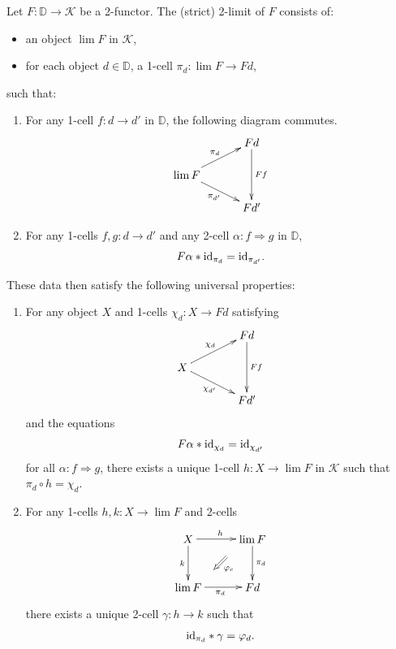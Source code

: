 \begin{Defi}[(2-limits)]\label{Defi:2limit}
Let $F \colon \mathbb{D} \rightarrow \mathcal{K}$ be a 2-functor. The (strict) 2-limit of $F$ consists of:
    \begin{itemize}
        \item an object $\lim F$ in $\mathcal{K}$,
        \item for each object $d \in \mathbb{D}$, a 1-cell $\pi_d \colon \lim F \rightarrow Fd$,
    \end{itemize}
such that:
    \begin{enumerate}
        \item For any 1-cell $f \colon d \rightarrow d'$ in $\mathbb{D}$, the following diagram commutes.
          \[
            \xy
              (0,0)*+{\lim F}="00";
              (20,10)*+{Fd}="10";
              (20,-10)*+{Fd'}="11";
              {\ar^{\pi_d} "00" ; "10"};
              {\ar_{\pi_{d'}} "00" ; "11"};
              {\ar^{Ff} "10" ; "11"};
            \endxy
          \]
        \item For any 1-cells $f, g \colon d \rightarrow d'$ and any 2-cell $\alpha \colon f \Rightarrow g$ in $\mathbb{D}$,
            \[
                F\alpha \ast \textrm{id}_{\pi_d} = \textrm{id}_{\pi_{d'}}.
            \]
    \end{enumerate}
These data then satisfy the following universal properties:
    \begin{enumerate}
        \item For any object $X$ and 1-cells $\chi_d \colon X \rightarrow Fd$ satisfying
          \[
            \xy
              (0,0)*+{X}="00";
              (20,10)*+{Fd}="10";
              (20,-10)*+{Fd'}="11";
              {\ar^{\chi_d} "00" ; "10"};
              {\ar_{\chi_{d'}} "00" ; "11"};
              {\ar^{Ff} "10" ; "11"};
            \endxy
          \]
          and the equations
           \[
                F\alpha \ast \textrm{id}_{\chi_d} = \textrm{id}_{\chi_{d'}}
            \]
            for all $\alpha \colon f \Rightarrow g$,   
            there exists a unique 1-cell $h \colon X \rightarrow \lim F$ in $\mathcal{K}$ such that $\pi_d \circ h = \chi_d$.
        \item For any 1-cells $h, k \colon X \rightarrow \lim F$ and 2-cells
          \[
            \xy
              (0,0)*+{X}="00";
              (20,0)*+{\lim F}="10";
              (20,-15)*+{Fd}="11";
              (0,-15)*+{\lim F}="01";
              {\ar^{h} "00" ; "10"};
              {\ar_{k} "00" ; "01"};
              {\ar^{\pi_d} "10" ; "11"};
              {\ar_{\pi_d} "01" ; "11"};
              {\ar@{=>}^{\varphi_c} (12,-5.5) ; (8,-9.5)};
            \endxy
          \]
        there exists a unique 2-cell $\gamma \colon h \rightarrow k$ such that
            \[
                \textrm{id}_{\pi_d} \ast \gamma = \varphi_d.
            \]
    \end{enumerate}
\end{Defi}

